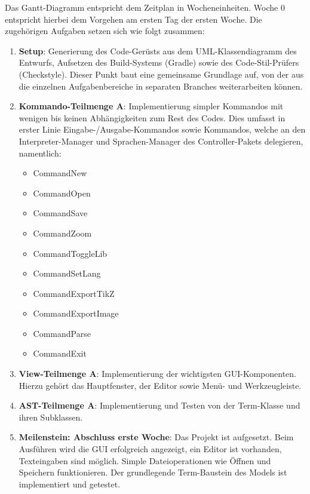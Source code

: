 \documentclass[parskip=full,11pt,twoside]{scrartcl}
\begin{document}
Das Gantt-Diagramm entspricht dem Zeitplan in Wocheneinheiten. Woche 0 entspricht hierbei dem Vorgehen am ersten Tag der ersten Woche. Die zugehörigen Aufgaben setzen sich wie folgt zusammen:
\begin{enumerate}
	\item \textbf{Setup}: Generierung des Code-Gerüsts aus dem UML-Klassendiagramm des Entwurfs, Aufsetzen des Build-Systems (Gradle) sowie des Code-Stil-Prüfers (Checkstyle). Dieser Punkt baut eine gemeinsame Grundlage auf, von der aus die einzelnen Aufgabenbereiche in separaten Branches weiterarbeiten können.
	
	\item \textbf{Kommando-Teilmenge A}: Implementierung simpler Kommandos mit wenigen bis keinen Abhängigkeiten zum Rest des Codes. Dies umfasst in erster Linie Eingabe-/Ausgabe-Kommandos sowie Kommandos, welche an den Interpreter-Manager und Sprachen-Manager des Controller-Pakets delegieren, namentlich:
	\begin{multicols}{3}
		\begin{itemize}
			\item CommandNew
			\item CommandOpen
			\item CommandSave
			\item CommandZoom

			\item CommandToggleLib
			\item CommandSetLang
			\item CommandExportTikZ
			\item CommandExportImage

			\item CommandParse
			\item CommandExit
		\end{itemize}
	\end{multicols}

	\item \textbf{View-Teilmenge A}: Implementierung der wichtigsten GUI-Komponenten. Hierzu gehört das Hauptfenster, der Editor sowie Menü- und Werkzeugleiste.
	
	\item \textbf{AST-Teilmenge A}: Implementierung und Testen von der Term-Klasse und ihren Subklassen.
	
	\item \textbf{Meilenstein: Abschluss erste Woche}: Das Projekt ist aufgesetzt. Beim Ausführen wird die GUI erfolgreich angezeigt, ein Editor ist vorhanden, Texteingaben sind möglich. Simple Dateioperationen wie Öffnen und Speichern funktionieren. Der grundlegende Term-Baustein des Models ist implementiert und getestet.


\end{enumerate}
\end{document}
